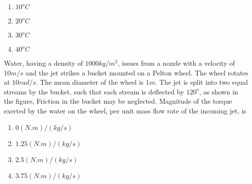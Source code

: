     \begin{multicols}{4}
        \begin{enumerate}
            \item $10^o C$
            \item $20^o C$
            \item $30^o C$
            \item $40^o C$
        \end{enumerate}
    \end{multicols}

    \item Water, having a density of $1000 kg/m^3$, issues from a nozzle with a velocity of $10 m/s$ and the jet strikes a bucket mounted on a Pelton wheel. The wheel rotates at $10 rad/s$. The mean diameter of the wheel is $1 m$. The jet is split into two equal streams by the bucket, such that each stream is deflected by $120^o$, as shown in the figure, Friction in the bucket may be neglected. Magnitude of the torque exerted by the water on the wheel, per unit mass flow rate of the incoming jet, is

    \begin{figure}[!ht]
\centering
{}%

\label{fig:my_label}
    \end{figure}
    
    \begin{multicols}{2}
        \begin{enumerate}
            \item $0 (N.m)/(kg/s)$
            \item $1.25(N.m)/(kg/s)$
            \item $2.5(N.m)/(kg/s)$
            \item $3.75(N.m)/(kg/s)$
        \end{enumerate}
    \end{multicols}



    


